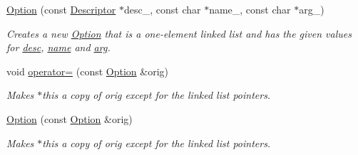 \begin{DoxyCompactItemize}
\hyperlink{classoption_1_1Option_a385221e2a8f37c548f0d5777bfddb216}{Option} (const \hyperlink{structoption_1_1Descriptor}{Descriptor} $\ast$desc\+\_\+, const char $\ast$name\+\_\+, const char $\ast$arg\+\_\+)
\begin{DoxyCompactList}\small\item\em Creates a new \hyperlink{classoption_1_1Option}{Option} that is a one-\/element linked list and has the given values for \hyperlink{classoption_1_1Option_af8d664a7b5de1425008b1812a90a0c23}{desc}, \hyperlink{classoption_1_1Option_a02a76b4896abd22d0ba8514362261de9}{name} and \hyperlink{classoption_1_1Option_a402be734987458364b0f473acae36238}{arg}. \end{DoxyCompactList}\item 
void \hyperlink{classoption_1_1Option_adb4b44f3778df8f28a04c48bd1b4a72b}{operator=} (const \hyperlink{classoption_1_1Option}{Option} \&orig)
\begin{DoxyCompactList}\small\item\em Makes {\ttfamily $\ast$this} a copy of {\ttfamily orig} except for the linked list pointers. \end{DoxyCompactList}\item 
\hyperlink{classoption_1_1Option_a4053240fecad1a3b1d8e4dc06b7aa8c4}{Option} (const \hyperlink{classoption_1_1Option}{Option} \&orig)
\begin{DoxyCompactList}\small\item\em Makes {\ttfamily $\ast$this} a copy of {\ttfamily orig} except for the linked list pointers. \end{DoxyCompactList}\end{DoxyCompactItemize}
